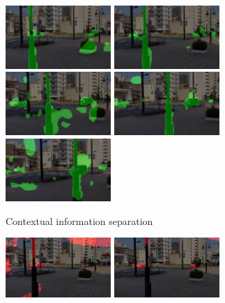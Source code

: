 \documentclass[10pt, twocolumn]{article}
\begin{document}
\begin{figure}[ht]
  \centering
  \begin{subfigure}{0.25\textwidth}
    \includegraphics[width=4cm]{fig/contextual/frame_00000002.png}
    \includegraphics[width=4cm]{fig/contextual/frame_00000010.png}
    \includegraphics[width=4cm]{fig/contextual/frame_00000020.png}
    \includegraphics[width=4cm]{fig/contextual/frame_00000030.png}
    \includegraphics[width=4cm]{fig/contextual/frame_00000040.png}
    \caption{Contextual information separation}
  \end{subfigure}
  \hspace{0.001cm}
  \begin{subfigure}{0.25\textwidth}
    \includegraphics[width=4cm]{fig/proposed/00002.jpg}
    \includegraphics[width=4cm]{fig/proposed/00010.jpg}

\end{subfigure}
\end{figure}
\end{document}
